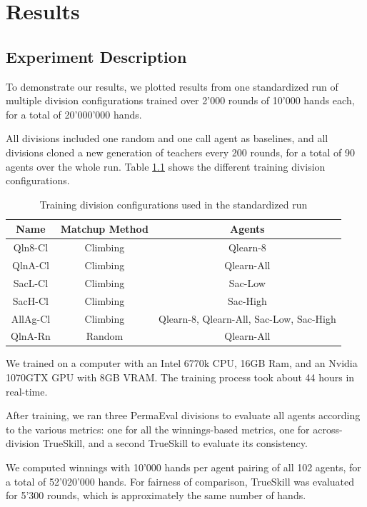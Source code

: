 \chapter{Results}
\label{Results}
\section{Experiment Description}
To demonstrate our results, we plotted results from one standardized run of multiple division configurations trained over 2'000 rounds of 10'000 hands each, for a total of 20'000'000 hands.

All divisions included one random and one call agent as baselines, and all divisions cloned a new generation of teachers every 200 rounds, for a total of 90 agents over the whole run. Table \ref{RunDivisions} shows the different training division configurations.

\begin{table}[h!]
\centering
\begin{tabular}{|| c | c | c ||} 
 \hline
 Name & Matchup Method & Agents \\ [0.5ex] 
 \hline\hline
 Qln8-Cl & Climbing & Qlearn-8 \\
 QlnA-Cl & Climbing & Qlearn-All \\
 SacL-Cl & Climbing & Sac-Low \\
 SacH-Cl & Climbing & Sac-High \\
 AllAg-Cl & Climbing & Qlearn-8, Qlearn-All, Sac-Low, Sac-High \\
 QlnA-Rn & Random & Qlearn-All \\ [1ex] 
 \hline
\end{tabular}
\caption{Training division configurations used in the standardized run}
\label{RunDivisions}
\end{table}

We trained on a computer with an Intel 6770k CPU, 16GB Ram, and an Nvidia 1070GTX GPU with 8GB VRAM. The training process took about 44 hours in real-time.

After training, we ran three PermaEval divisions to evaluate all agents according to the various metrics: one for all the winnings-based metrics, one for across-division TrueSkill, and a second TrueSkill to evaluate its consistency.

We computed winnings with 10'000 hands per agent pairing of all 102 agents, for a total of 52'020'000 hands. For fairness of comparison, TrueSkill was evaluated for 5'300 rounds, which is approximately the same number of hands.


